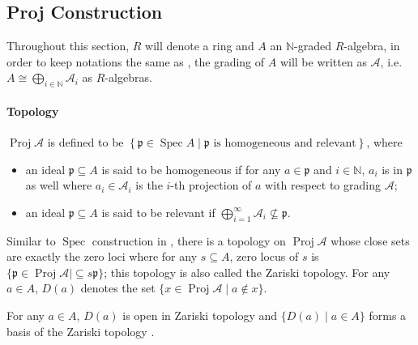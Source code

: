 \documentclass[a4paper,UKenglish,cleveref, autoref, thm-restate]{lipics-v2021}
\begin{document}
\subsection{Proj Construction}\label{sec:proj_construction_maths}
Throughout this section, $R$ will denote a ring and $A$ an $\mathbb{N}$-graded $R$-algebra, in order to keep notations the same as , the grading of $A$ will be written as $\mathcal{A}$, i.e. $A\cong \bigoplus_{i\in\mathbb{N}}\mathcal{A}_i$ as $R$-algebras.

\paragraph*{Topology}
\begin{definition}
    $\operatorname{Proj}\mathcal{A}$ is defined to be
    $
        \left\{\mathfrak{p}\in \operatorname{Spec}A\mid \mathfrak{p}\text{~is homogeneous and relevant}\right\}    
    $, where
    \begin{itemize}
        \item an ideal $\mathfrak{p}\subseteq A$ is said to be homogeneous if for any $a \in \mathfrak{p}$ and $i\in \mathbb{N}$, $a_i$ is in $\mathfrak{p}$ as well where $a_i \in \mathcal{A}_i$ is the $i$-th projection of $a$ with respect to grading $\mathcal{A}$;
        \item an ideal $\mathfrak{p}\subseteq A$ is said to be relevant if $\bigoplus_{i=1}^\infty \mathcal{A}_i\not\subseteq \mathfrak{p}$.
    \end{itemize}
\end{definition}

Similar to $\operatorname{Spec}$ construction in , there is a topology on $\operatorname{Proj}\mathcal{A}$ whose close sets are exactly the zero loci where for any $s \subseteq A$, zero locus of $s$ is $\{\mathfrak p\in \operatorname{Proj}\mathcal{A}\mid \subseteq s \mathfrak{p}\}$; this topology is also called the Zariski topology. For any $a \in A$, $D(a)$ denotes the set $\{x\in \operatorname{Proj}\mathcal{A}\mid a\not\in x\}$.

\begin{theorem} 
    For any $a\in A$, $D(a)$ is open in Zariski topology and $\{D(a)\mid a\in A\}$ forms a basis of the Zariski topology \cite{stacks-project}.
    
\end{theorem}
\end{document}

